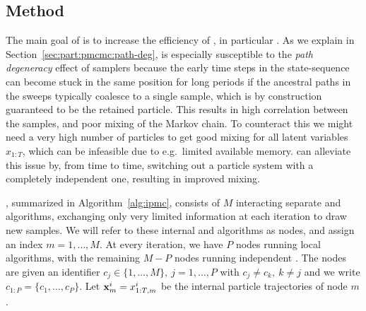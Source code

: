 
\subsection{Method}
\label{sec:method}

The main goal of \ipmcmc is to increase the efficiency of \pmcmc, in particular \pg. 
As we explain in Section~\ref{sec:part:pmcmc:path-deg}, \pg is especially
susceptible to the \emph{path degeneracy} effect of \smc samplers because the early
time steps in the state-sequence can become stuck in the same position for long
periods if the ancestral paths in the \csmc sweeps typically coalesce to a single sample,
which is by construction guaranteed to be the retained particle.
This results in high correlation between the samples, and poor mixing of the Markov chain. %
To counteract this we might need a very high number of particles to get good mixing for all latent variables $x_{1:T}$, which can be infeasible due to e.g.~limited available memory. \ipmc can alleviate this issue by, from time to time, switching out a \csmc particle system with a completely independent \smc one, resulting in improved mixing.

\ipmcmc, summarized in Algorithm~\ref{alg:ipmc}, consists of $M$ interacting separate \csmc and \smc algorithms, exchanging only very limited information at each iteration to draw new \mcmc samples. We will refer to these internal \csmc and \smc algorithms as nodes, and assign an index $m=1,\ldots,M$. 
At every iteration, we have $P$ nodes running local \csmc algorithms, with the remaining
$M-P$ nodes running independent \smc.
The \csmc nodes are given an identifier $c_j \in \{1,\ldots,M\}, ~j=1,\ldots,P$ with $c_j \neq c_k,~k \neq j$ and we write $c_{1:P} = \{c_1,\ldots,c_P\}$. Let $\mathbf{x}_m^i = x_{1:T,m}^i$ be the internal particle trajectories of node $m$.

